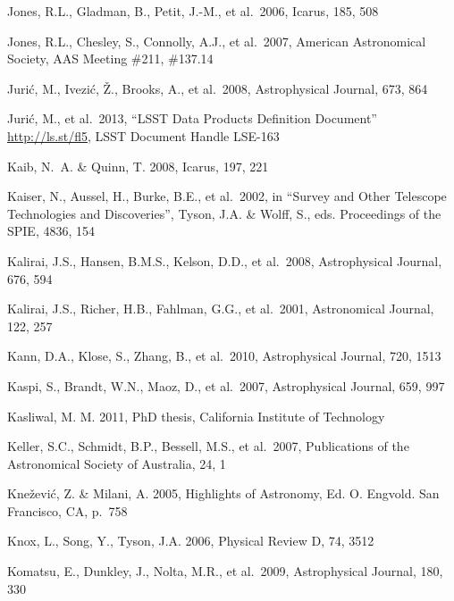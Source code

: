 \documentclass{emulateapj}
\begin{document}
\begin{thebibliography}{}
\bibitem[()]{} Jones, R.L., Gladman, B., Petit, J.-M., et al.~2006, Icarus, 185, 508

\bibitem[()]{} Jones, R.L., Chesley, S., Connolly, A.J., et al.~2007, American Astronomical Society, AAS
             Meeting \#211, \#137.14

\bibitem[()]{} Juri\'{c}, M., Ivezi\'c, \v Z., Brooks, A., et al.~2008, Astrophysical Journal, 673, 864

\bibitem[()]{} Juri\'{c}, M., et al.~2013, ``LSST Data Products Definition Document'' \url{http://ls.st/fl5}, LSST Document Handle LSE-163

\bibitem[()]{} Kaib, N.~A. \& Quinn, T. 2008, Icarus, 197, 221

\bibitem[()]{} Kaiser, N., Aussel, H., Burke, B.E., et al.~2002, in ``Survey and Other Telescope
             Technologies and Discoveries'', Tyson, J.A. \& Wolff, S.,
             eds. Proceedings of the SPIE, 4836, 154

\bibitem[()]{} Kalirai, J.S., Hansen, B.M.S., Kelson, D.D., et al.~2008, Astrophysical Journal, 676, 594

\bibitem[()]{} Kalirai, J.S., Richer, H.B., Fahlman, G.G., et al.~2001, Astronomical Journal, 122, 257


\bibitem[()]{} Kann, D.A., Klose, S., Zhang, B., et al.~2010, Astrophysical Journal, 720, 1513


\bibitem[()]{} Kaspi, S., Brandt, W.N., Maoz, D., et al.~2007, Astrophysical Journal, 659, 997

\bibitem[()]{} Kasliwal, M. M. 2011, PhD thesis, California Institute of Technology

\bibitem[()]{} Keller, S.C., Schmidt, B.P., Bessell, M.S., et al.~2007, Publications of the Astronomical
             Society of Australia, 24, 1

\bibitem[()]{} Kne\v{z}evi\'{c}, Z. \& Milani, A. 2005, Highlights of Astronomy, Ed. O. Engvold. San
             Francisco, CA, p.~758

\bibitem[()]{} Knox, L., Song, Y., Tyson, J.A. 2006, Physical Review D, 74, 3512

\bibitem[()]{} Komatsu, E., Dunkley, J., Nolta, M.R., et al.~2009, Astrophysical Journal, 180, 330


\end{thebibliography}
\end{document}
